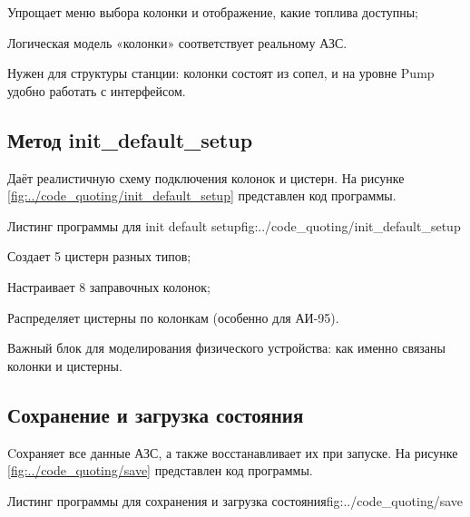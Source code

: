 \documentclass{vvsu}
\begin{document}
\begin{vvsu_itemize}
  \item Упрощает меню выбора колонки и отображение, какие топлива доступны;
  \item Логическая модель «колонки» соответствует реальному АЗС.
\end{vvsu_itemize}

  Нужен для структуры станции: колонки состоят из сопел, и на уровне Pump удобно работать с интерфейсом.


\subsection{Метод init\_default\_setup}
  Даёт реалистичную схему подключения колонок и цистерн.
На рисунке \ref{fig:../code_quoting/init_default_setup} представлен код программы.

\begin{vvsu_figure}{Листинг программы для init default setup}{fig:../code_quoting/init_default_setup}
  \begin{minipage}{.75\textwidth}
    
  \end{minipage}
\end{vvsu_figure}

\begin{vvsu_itemize}
  \item Создает 5 цистерн разных типов;
  \item Настраивает 8 заправочных колонок;
  \item Распределяет цистерны по колонкам (особенно для АИ-95).
\end{vvsu_itemize}
  
  Важный блок для моделирования физического устройства: как именно связаны колонки и цистерны.


\subsection{Сохранение и загрузка состояния}
  Cохраняет все данные АЗС, а также восстанавливает их при запуске.
  На рисунке \ref{fig:../code_quoting/save} представлен код программы.

\begin{vvsu_figure}{Листинг программы для сохранения и загрузка состояния}{fig:../code_quoting/save}
  \begin{minipage}{.75\textwidth}
    
  \end{minipage}
\end{vvsu_figure}
\end{document}
